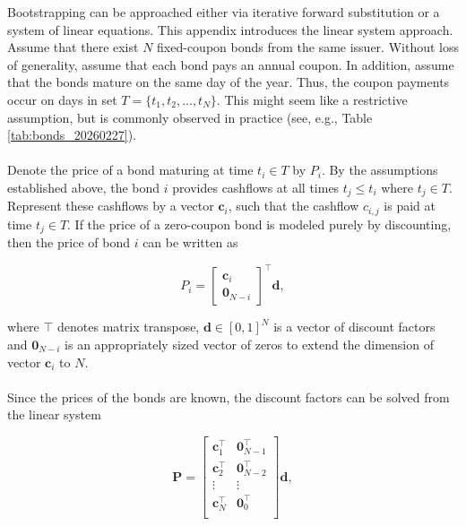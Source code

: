 \documentclass[a4paper]{artikel3}
\numberwithin{equation}{section}
\numberwithin{theorem}{section}
\numberwithin{proposition}{section}
\numberwithin{lemma}{section}
\begin{document}
Bootstrapping can be approached either via iterative forward substitution or a system of linear equations. This appendix introduces the linear system approach. Assume that there exist $N$ fixed-coupon bonds from the same issuer. Without loss of generality, assume that each bond pays an annual coupon. In addition, assume that the bonds mature on the same day of the year. Thus, the coupon payments occur on days in set $T = \{t_1, t_2, ..., t_N \}$. This might seem like a restrictive assumption, but is commonly observed in practice (see, e.g., Table \ref{tab:bonds_20260227}). \\
\\
Denote the price of a bond maturing at time $t_i \in T$ by $P_i$. By the assumptions established above, the bond $i$ provides cashflows at all times $t_j \leq t_i$ where $t_j \in T$. Represent these cashflows by a vector $\mathbf{c}_i$, such that the cashflow $c_{i,j}$ is paid at time $t_j \in T$. If the price of a zero-coupon bond is modeled purely by discounting, then the price of bond $i$ can be written as

\begin{equation*}
    P_i = 
    \begin{bmatrix}
        \mathbf{c}_{i} \\
        \mathbf{0}_{N-i}
    \end{bmatrix}^\top \mathbf{d} ,
\end{equation*}

where $\top$ denotes matrix transpose, $\mathbf{d} \in [0, 1]^N$ is a vector of discount factors and $\mathbf{0}_{N-i}$ is an appropriately sized vector of zeros to extend the dimension of vector $\mathbf{c}_{i}$ to $N$. \\
\\
Since the prices of the bonds are known, the discount factors can be solved from the linear system

\begin{equation}
    \label{eq:basic_bootstrap}
    \mathbf{P} = 
    \begin{bmatrix}
        \mathbf{c}_{1}^\top & \mathbf{0}_{N-1}^\top \\
        \mathbf{c}_{2}^\top & \mathbf{0}_{N-2}^\top \\
        \vdots           & \vdots             \\
        \mathbf{c}_{N}^\top & \mathbf{0}_{0}^\top   \\
    \end{bmatrix} \mathbf{d} ,
\end{equation}
\end{document}
